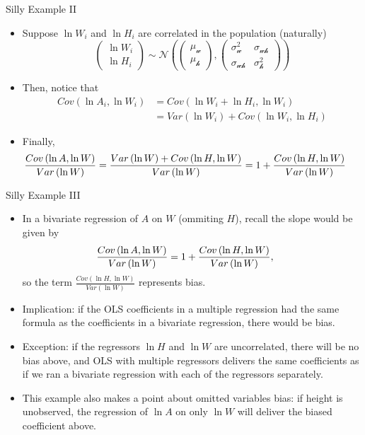 \begin{frame}{Silly Example II}
	\begin{itemize}
	\item Suppose $\ln W_i$ and $\ln H_i$ are correlated in the population (naturally)\[
\left(\begin{array}{c}
\ln W_{i}\\
\ln H_{i}
\end{array}\right)\sim\mathcal{N\left(\left(\begin{array}{c}
\mu_w\\
\mu_h
\end{array}\right),\left(\begin{array}{cc}
\sigma_{w}^{2} & \sigma_{wh}\\
\sigma_{wh} & \sigma_{h}^{2}
\end{array}\right)\right)}
\]
	\smallskip
	\item Then, notice that\[
	\begin{array}{ll}
	Cov\left( \ln A_{i}, \ln W_{i}\right) & = Cov\left(\ln W_{i} + \ln H_{i}, \ln W_{i}\right) \\
	& = Var\left( \ln W_{i}\right) + Cov\left(\ln W_{i}, \ln H_{i}\right) 
	\end{array}
	\]

	\smallskip
	\item Finally, \[
\hspace*{-.5cm}\frac{Cov\left(\ln A,\ln W\right)}{Var\left(\ln W\right)}=\frac{Var\left(\ln W\right)+Cov\left(\ln H,\ln W\right)}{Var\left(\ln W\right)}=1+\frac{Cov\left(\ln H,\ln W\right)}{Var\left(\ln W\right)}
\]
\end{itemize}
\end{frame}


\begin{frame}{Silly Example III}
	\begin{itemize}
	\item In a bivariate regression of $A$ on $W$ (ommiting $H$), recall the slope would be given by \[
	\hspace*{-.5cm}\frac{Cov\left(\ln A,\ln W\right)}{Var\left(\ln W\right)}=1+\frac{Cov\left(\ln H,\ln W\right)}{Var\left(\ln W\right)},
	\]
	so the term $\frac{Cov\left(\ln H,\ln W\right)}{Var\left(\ln W\right)}$ represents bias. 

	\smallskip
	\item Implication: if the OLS coefficients in a multiple regression had the same formula 
	as the coefficients in a bivariate regression, there would be bias. 

	\smallskip
	\item Exception: if the regressors $\ln H$ and $\ln W$ are uncorrelated, there will be no bias above, and
	OLS with multiple regressors delivers the same coefficients as if we ran a bivariate regression with each
	of the regressors separately. 

	\smallskip
	\item This example also makes a point about omitted variables bias: if height is unobserved, the regression
	of $\ln A$ on only $\ln W$ will deliver the biased coefficient above.
	
\end{itemize}
\end{frame}

